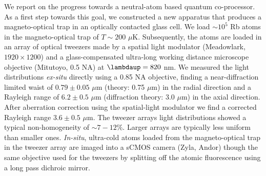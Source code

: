 \noindent We report on the progress towards a neutral-atom based quantum co-processor.
As a first step towards this goal, we constructed a new apparatus that produces a magneto-optical trap in an optically contacted glass cell. 
We load $\sim 10^5$ Rb atoms in the magneto-optical trap of $T\sim200$ $\mu$K.
Subsequently, the atoms are loaded in an array of optical tweezers made by a spatial light modulator (Meadowlark, $1920 \times 1200$) and a glass-compensated ultra-long working distance microscope objective (Mitutoyo, 0.5 NA) at $\lambdaup = 820$ nm.
We measured the light distributions \textit{ex-situ} directly using a 0.85 NA objective, finding a near-diffraction limited waist of $0.79\pm0.05$ $\mu$m (theory: 0.75 $\mu$m) in the radial direction and a Rayleigh range of $6.2 \pm 0.5$ $\mu$m (diffraction theory: 3.0 $\mu$m) in the axial direction.
After aberration correction using the spatial-light modulator we find a corrected Rayleigh range $3.6\pm0.5$ $\mu$m.
The tweezer arrays light distributions showed a typical non-homogeneity of $\sim 7-12\%$.
Larger arrays are typically less uniform than smaller ones. 
\textit{In-situ}, ultra-cold atoms loaded from the magneto-optical trap in the tweezer array are imaged into a sCMOS camera (Zyla, Andor) though the same objective used for the tweezers by splitting off the atomic fluorescence using a long pass dichroic mirror.
